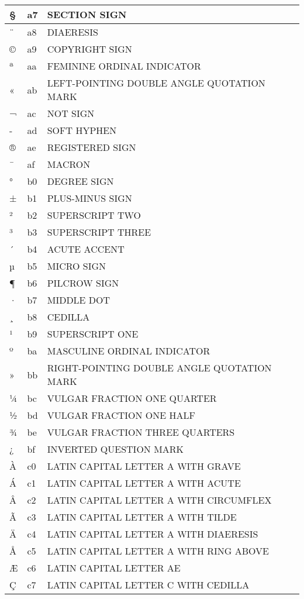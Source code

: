 \documentclass[12pt,letterpaper,openany]{book}
\begin{document}
\begin{center}
\begin{supertabular}{|m{0.25in}|m{0.5in}|m{4in}|}
§ & a7 & SECTION SIGN\\\hline
¨ & a8 & DIAERESIS\\\hline
© & a9 & COPYRIGHT SIGN\\\hline
ª & aa & FEMININE ORDINAL INDICATOR\\\hline
« & ab & LEFT-POINTING DOUBLE ANGLE QUOTATION MARK\\\hline
¬ & ac & NOT SIGN\\\hline
- & ad & SOFT HYPHEN\\\hline
® & ae & REGISTERED SIGN\\\hline
¯ & af & MACRON\\\hline
° & b0 & DEGREE SIGN\\\hline
± & b1 & PLUS-MINUS SIGN\\\hline
² & b2 & SUPERSCRIPT TWO\\\hline
³ & b3 & SUPERSCRIPT THREE\\\hline
´ & b4 & ACUTE ACCENT\\\hline
µ & b5 & MICRO SIGN\\\hline
¶ & b6 & PILCROW SIGN\\\hline
· & b7 & MIDDLE DOT\\\hline
¸ & b8 & CEDILLA\\\hline
¹ & b9 & SUPERSCRIPT ONE\\\hline
º & ba & MASCULINE ORDINAL INDICATOR\\\hline
» & bb & RIGHT-POINTING DOUBLE ANGLE QUOTATION MARK\\\hline
¼ & bc & VULGAR FRACTION ONE QUARTER\\\hline
½ & bd & VULGAR FRACTION ONE HALF\\\hline
¾ & be & VULGAR FRACTION THREE QUARTERS\\\hline
¿ & bf & INVERTED QUESTION MARK\\\hline
À & c0 & LATIN CAPITAL LETTER A WITH GRAVE\\\hline
Á & c1 & LATIN CAPITAL LETTER A WITH ACUTE\\\hline
Â & c2 & LATIN CAPITAL LETTER A WITH CIRCUMFLEX\\\hline
Ã & c3 & LATIN CAPITAL LETTER A WITH TILDE\\\hline
Ä & c4 & LATIN CAPITAL LETTER A WITH DIAERESIS\\\hline
Å & c5 & LATIN CAPITAL LETTER A WITH RING ABOVE\\\hline
Æ & c6 & LATIN CAPITAL LETTER AE\\\hline
Ç & c7 & LATIN CAPITAL LETTER C WITH CEDILLA\\\hline

\end{supertabular}
\end{center}
\end{document}
